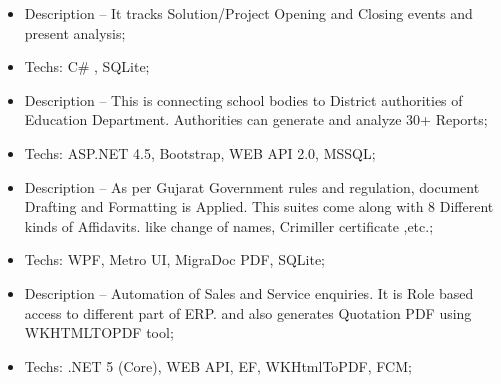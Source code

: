 \documentclass[10pt,a4paper]{altacv}
\begin{document}
\divider
%



\begin{itemize}
  \item Description -- It tracks Solution/Project Opening and Closing events and present analysis;
  \item Techs: C\# , SQLite;
\end{itemize}

\divider

%


\begin{itemize}
  \item Description -- This is connecting school bodies to District authorities of Education Department. Authorities  can generate and analyze 30+ Reports;
  \item Techs: ASP.NET 4.5, Bootstrap, WEB API 2.0, MSSQL;
\end{itemize}

\divider

\begin{itemize}
  \item Description -- As per Gujarat Government rules and regulation, document Drafting and Formatting is Applied. This suites come along with 8 Different kinds of Affidavits. like change of names, Crimiller certificate ,etc.;
  \item Techs: WPF, Metro UI, MigraDoc PDF, SQLite;
\end{itemize}

\divider

%

\begin{itemize}
  \item Description -- Automation of Sales and Service enquiries. It is Role based access to different part of ERP. and also generates Quotation PDF using WKHTMLTOPDF tool;
  \item Techs: .NET 5 (Core), WEB API, EF, WKHtmlToPDF, FCM;
\end{itemize}

\end{document}
